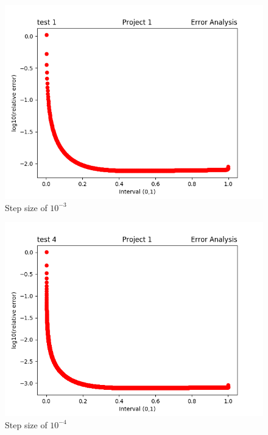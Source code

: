 \documentclass[11pt, oneside]{article}   	%
\begin{document}
\begin{figure}[H]
  \includegraphics[width=\linewidth]{test_3.png}
  \caption{Step size of $10^{-3}$}
  \label{fig:Relative Error}
\end{figure}

 \begin{figure}[H]
  \includegraphics[width=\linewidth]{test_4.png}
  \caption{Step size of $10^{-4}$}
  \label{fig:Relative Error}
\end{figure}
\end{document}
